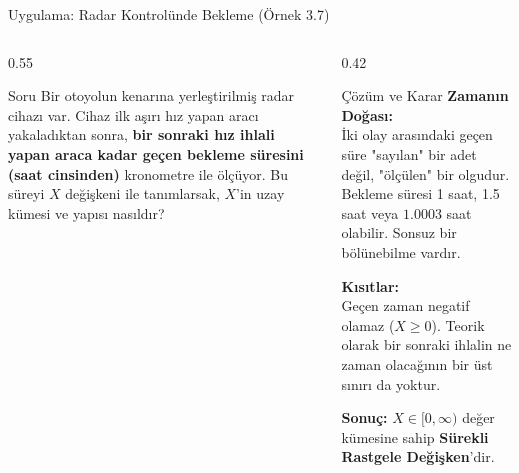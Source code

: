 \documentclass[light]{lutbeamer}
\begin{document}
\begin{frame}{Uygulama: Radar Kontrolünde Bekleme (Örnek 3.7)}
\small
\begin{columns}[T]
  \begin{column}{0.55\textwidth}
    \begin{block}{Soru}
      Bir otoyolun kenarına yerleştirilmiş radar cihazı var. 
      Cihaz ilk aşırı hız yapan aracı yakaladıktan sonra, \textbf{bir sonraki hız ihlali yapan araca kadar geçen bekleme süresini (saat cinsinden)} kronometre ile ölçüyor.
      Bu süreyi $X$ değişkeni ile tanımlarsak, $X$'in uzay kümesi ve yapısı nasıldır?
    \end{block}
  \end{column}
  
  \begin{column}{0.42\textwidth}
    \begin{alertblock}{Çözüm ve Karar}
      \textbf{Zamanın Doğası:} \\
      İki olay arasındaki geçen süre "sayılan" bir adet değil, "ölçülen" bir olgudur. 
      Bekleme süresi 1 saat, 1.5 saat veya $1.0003$ saat olabilir. Sonsuz bir bölünebilme vardır.
      
      \vspace{0.15cm}
      \textbf{Kısıtlar:} \\
      Geçen zaman negatif olamaz ($X \ge 0$). Teorik olarak bir sonraki ihlalin ne zaman olacağının bir üst sınırı da yoktur.
      
      \vspace{0.15cm}
      \textbf{Sonuç:} $X \in [0, \infty)$ değer kümesine sahip \textbf{Sürekli Rastgele Değişken}'dir.
    \end{alertblock}
  \end{column}
\end{columns}
\end{frame}
\end{document}
